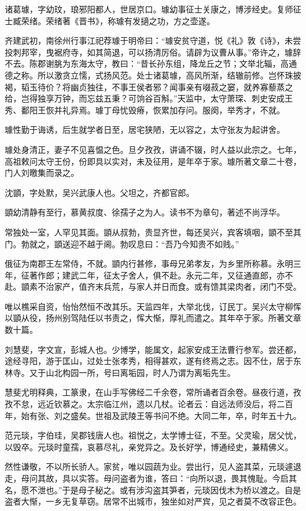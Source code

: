 \documentclass[12pt,UTF8]{ctexbook}
\begin{document}
诸葛璩，字幼玟，琅邪阳都人，世居京口。璩幼事征士关康之，博涉经史。复师征士臧荣绪。荣绪著《晋书》，称璩有发擿之功，方之壶遂。

齐建武初，南徐州行事江祀荐璩于明帝曰：“璩安贫守道，悦《礼》敦《诗》，未尝投刺邦宰，曳裾府寺，如其简退，可以扬清厉俗。请辟为议曹从事。”帝许之，璩辞不去。陈郡谢朓为东海太守，教曰：“昔长孙东组，降龙丘之节；文举北辎，高通德之称。所以激贪立懦，式扬风范。处士诸葛璩，高风所渐，结辙前修。岂怀珠披褐，韬玉待价？将幽贞独往，不事王侯者邪？闻事亲有啜菽之窭，就养寡藜蒸之给，岂得独享万钟，而忘兹五秉？可饷谷百斛。”天监中，太守萧琛、刺史安成王秀、鄱阳王恢并礼异焉。璩丁母忧毁瘠，恢累加存问。服阕，举秀才，不就。

璩性勤于诲诱，后生就学者日至，居宅狭陋，无以容之，太守张友为起讲舍。

璩处身清正，妻子不见喜愠之色。旦夕孜孜，讲诵不辍，时人益以此宗之。七年，高祖敕问太守王份，份即具以实对，未及征用，是年卒于家。璩所著文章二十卷，门人刘曒集而录之。

沈顗，字处默，吴兴武康人也。父坦之，齐都官郎。

顗幼清静有至行，慕黄叔度、徐孺子之为人。读书不为章句，著述不尚浮华。

常独处一室，人罕见其面。顗从叔勃，贵显齐世，每还吴兴，宾客填咽，顗不至其门。勃就之，顗送迎不越于阃。勃叹息曰：“吾乃今知贵不如贱。”

俄征为南郡王左常侍，不就。顗内行甚修，事母兄弟孝友，为乡里所称慕。永明三年，征著作郎；建武二年，征太子舍人，俱不赴。永元二年，又征通直郎，亦不赴。顗素不治家产，值齐末兵荒，与家人并日而食。或有馈其梁肉者，闭门不受。

唯以樵采自资，怡怡然恒不改其乐。天监四年，大举北伐，订民丁。吴兴太守柳恽以顗从役，扬州别驾陆任以书责之，恽大惭，厚礼而遣之。其年卒于家。所著文章数十篇。

刘慧斐，字文宣，彭城人也。少博学，能属文，起家安成王法曹行参军。尝还都，途经寻阳，游于匡山，过处士张孝秀，相得甚欢，遂有终焉之志。因不仕，居于东林寺。又于山北构园一所，号曰离垢园，时人乃谓为离垢先生。

慧斐尤明释典，工篆隶，在山手写佛经二千余卷，常所诵者百余卷。昼夜行道，孜孜不怠，远近钦慕之。太宗临江州，遗以几杖。论者云：自远法师没后，将二百年，始有张、刘之盛矣。世祖及武陵王等书问不绝。大同二年，卒，时年五十九。

范元琰，字伯珪，吴郡钱唐人也。祖悦之，太学博士征，不至。父灵瑜，居父忧，以毁卒。元琰时童孺，哀慕尽礼，亲党异之。及长好学，博通经史，兼精佛义。

然性谦敬，不以所长骄人。家贫，唯以园蔬为业。尝出行，见人盗其菜，元琰遽退走，母问其故，具以实答。母问盗者为谁，答曰：“向所以退，畏其愧耻。今启其名，愿不泄也。”于是母子秘之。或有涉沟盗其笋者，元琰因伐木为桥以渡之。自是盗者大惭，一乡无复草窃。居常不出城市，独坐如对严宾，见之者莫不改容正色。
\end{document}
